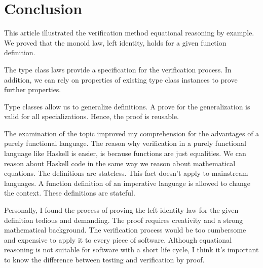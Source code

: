 
\section{Conclusion}

This article illustrated the verification method equational reasoning by example. We proved that the monoid law, left identity, holds for a given function definition. 

The type class laws provide a specification for the verification process. In addition, we can rely on properties of existing type class instances to prove further properties.

Type classes allow us to generalize definitions. A prove for the generalization is valid for all specializations. Hence, the proof is reusable.

The examination of the topic improved my comprehension for the advantages of a purely functional language. The reason why verification in a purely functional language like Haskell is easier, is because functions are just equalities. We can reason about Haskell code in the same way we reason about mathematical equations. The definitions are stateless. This fact doesn't apply to mainstream languages. A function definition of an imperative language is allowed to change the context. These definitions are stateful.

Personally, I found the process of proving the left identity law for the given definition tedious and demanding. The proof requires creativity and a strong mathematical background. The verification process would be too cumbersome and expensive to apply it to every piece of software. Although equational reasoning  is not suitable for software with a short life cycle, I think it's important to know the difference between testing and verification by proof.
